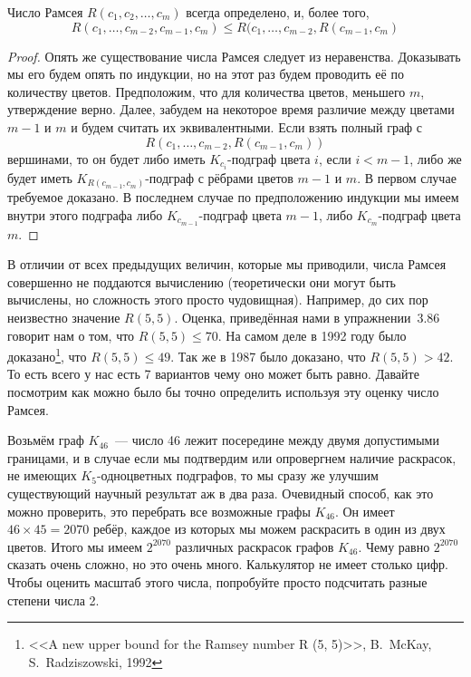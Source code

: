 \begin{thm}
Число Рамсея $R(c_1, c_2, \ldots, c_m)$ всегда определено, и, более того,
$$R(c_1, \ldots,c_{m-2}, c_{m-1}, c_m) \le R(c_1, \ldots, c_{m-2}, R(c_{m-1}, c_m)$$
\end{thm}
\begin{proof}
Опять же существование числа Рамсея следует из неравенства. Доказывать мы его будем опять по индукции, но на этот раз будем проводить её по количеству цветов. Предположим, что для количества цветов, меньшего $m$, утверждение верно. Далее, забудем на некоторое время различие между цветами $m-1$ и $m$ и будем считать их эквивалентными. Если взять полный граф с
$$R(c_1, \ldots, c_{m-2}, R(c_{m-1}, c_m))$$
вершинами, то он будет либо иметь $K_{c_i}$-подграф цвета $i$, если $i<m-1$, либо же будет иметь $K_{R(c_{m-1}, c_m)}$-подграф с рёбрами цветов $m-1$ и $m$. В первом случае требуемое доказано. В последнем случае по предположению индукции мы имеем внутри этого подграфа либо $K_{c_{m-1}}$-подграф цвета $m-1$, либо $K_{c_m}$-подграф цвета $m$.
\end{proof}

В отличии от всех предыдущих величин, которые мы приводили, числа Рамсея совершенно не поддаются вычислению (теоретически они могут быть вычислены, но сложность этого просто чудовищная). Например, до сих пор неизвестно значение $R(5, 5)$. Оценка, приведённая нами в упражнении~3.86 говорит нам о том, что $R(5, 5)\le70$. На самом деле в 1992 году было доказано\footnote{<<A new upper bound for the Ramsey number R (5, 5)>>, B.~McKay, S.~Radziszowski, 1992}, что $R(5, 5)\le 49$. Так же в 1987 было доказано, что $R(5, 5) > 42$. То есть всего у нас есть 7 вариантов чему оно может быть равно. Давайте посмотрим как можно было бы точно определить используя эту оценку число Рамсея.

Возьмём граф $K_{46}$~--- число 46 лежит посередине между двумя допустимыми границами, и в случае если мы подтвердим или опровергнем наличие раскрасок, не имеющих $K_5$-одноцветных подграфов, то мы сразу же улучшим существующий научный результат аж в два раза. Очевидный способ, как это можно проверить, это перебрать все возможные графы $K_{46}$. Он имеет $46\times45 = 2070$ ребёр, каждое из которых мы можем раскрасить в один из двух цветов. Итого мы имеем $2^{2070}$ различных раскрасок графов $K_{46}$. Чему равно $2^{2070}$ сказать очень сложно, но это очень много. Калькулятор не имеет столько цифр. Чтобы оценить масштаб этого числа, попробуйте просто подсчитать разные степени числа 2.

